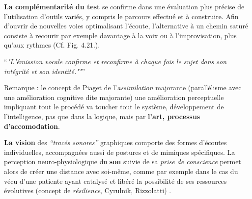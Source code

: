 
 \textbf{La complémentarité du test} se confirme dans une évaluation plus
 précise de l'utilisation d'outils variés, y compris  le parcours effectué et à
 construire.
 Afin d'ouvrir de nouvelles
 voies optimalisant l'écoute, l'alternative à un chemin saturé
 consiste à recourir par exemple davantage  à la voix ou à l'improvisation,
 plus qu'aux rythmes (Cf. Fig. 4.21.).

 \enquote{\emph{"L'émission vocale confirme et reconfirme à chaque
 fois le sujet dans son intégrité et son identité.""}}%
 \autocite{tomatis:loreille} %




  Remarque : le concept de Piaget de l'\textit{assimilation}
  majorante (parallélisme avec une amélioration cognitive dite majorante)
une amélioration perceptuelle impliquant tout le procédé va toucher tout le
système, développement de l'intelligence, pas que dans la logique, mais
par \textbf{l'art, processus d'accomodation}.


 \textbf{La vision}
des \textit{``tracés sonores''} graphiques comporte des formes
d'écoutes individuelles, accompagnées aussi de postures et de mimiques spécifiques.
La  perception
neuro-physiologique du \textbf{son} suivie de sa
 \textit{prise de conscience }
permet alors de créer une distance avec
soi-même, comme par exemple dans le cas
du vécu  d'une patiente ayant catalysé et libéré
la possibilité de ses ressources évolutives (concept de \textit{résilience}, Cyrulnik, Rizzolatti) \autocite[27--63]{van_eersel_cerveau}.


